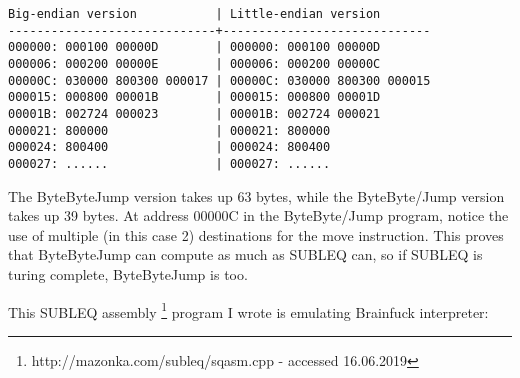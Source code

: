\documentclass{article}
\begin{document}
\begin{verbatim}
Big-endian version           | Little-endian version
-----------------------------+-----------------------------
000000: 000100 00000D        | 000000: 000100 00000D
000006: 000200 00000E        | 000006: 000200 00000C
00000C: 030000 800300 000017 | 00000C: 030000 800300 000015
000015: 000800 00001B        | 000015: 000800 00001D
00001B: 002724 000023        | 00001B: 002724 000021
000021: 800000               | 000021: 800000
000024: 800400               | 000024: 800400
000027: ......               | 000027: ......
\end{verbatim}

\par The ByteByteJump version takes up 63 bytes, while the ByteByte/Jump version takes up 39 bytes. At address 00000C in the ByteByte/Jump program, notice the use of multiple (in this case 2) destinations for the move instruction. This proves that ByteByteJump can compute as much as SUBLEQ can, so if SUBLEQ is turing complete, ByteByteJump is too.

\par This SUBLEQ assembly \footnote{http://mazonka.com/subleq/sqasm.cpp - accessed 16.06.2019} program I wrote is emulating Brainfuck interpreter:
\end{document}
